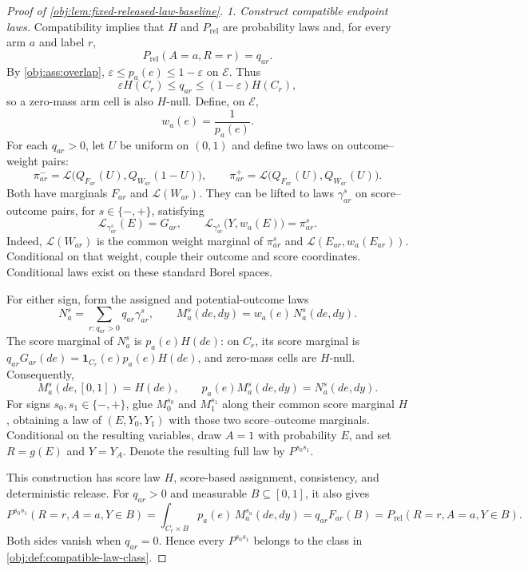 \begin{proof}[Proof of \cref{obj:lem:fixed-released-law-baseline}]
\noindent\emph{1. Construct compatible endpoint laws.}
Compatibility implies that \(H\) and \(P_{\mathrm{rel}}\) are probability laws and, for every arm \(a\) and label \(r\),
\[
P_{\mathrm{rel}}(A=a,R=r)=q_{ar}.
\]
By \cref{obj:ass:overlap}, \(\varepsilon\le p_a(e)\le 1-\varepsilon\) on \(\mathcal E\). Thus
\[
\varepsilon H(C_r)\le q_{ar}\le(1-\varepsilon)H(C_r),
\]
so a zero-mass arm cell is also \(H\)-null. Define, on \(\mathcal E\),
\[
w_a(e)=\frac{1}{p_a(e)}.
\]
For each \(q_{ar}>0\), let \(U\) be uniform on \((0,1)\) and define two laws on outcome–weight pairs:
\[
\pi_{ar}^{-}
=\mathcal L\bigl(Q_{F_{ar}}(U),Q_{W_{ar}}(1-U)\bigr),
\qquad
\pi_{ar}^{+}
=\mathcal L\bigl(Q_{F_{ar}}(U),Q_{W_{ar}}(U)\bigr).
\]
Both have marginals \(F_{ar}\) and \(\mathcal L(W_{ar})\). They can be lifted to laws \(\gamma_{ar}^{s}\) on score–outcome pairs, for \(s\in\{-,+\}\), satisfying
\[
\mathcal L_{\gamma_{ar}^{s}}(E)=G_{ar},
\qquad
\mathcal L_{\gamma_{ar}^{s}}\bigl(Y,w_a(E)\bigr)=\pi_{ar}^{s}.
\]
Indeed, \(\mathcal L(W_{ar})\) is the common weight marginal of \(\pi_{ar}^{s}\) and \(\mathcal L(E_{ar},w_a(E_{ar}))\). Conditional on that weight, couple their outcome and score coordinates. Conditional laws exist on these standard Borel spaces.

For either sign, form the assigned and potential-outcome laws
\[
N_a^{s}=\sum_{r:q_{ar}>0}q_{ar}\gamma_{ar}^{s},
\qquad
M_a^{s}(de,dy)=w_a(e)\,N_a^{s}(de,dy).
\]
The score marginal of \(N_a^{s}\) is \(p_a(e)H(de)\): on \(C_r\), its score marginal is \(q_{ar}G_{ar}(de)=\mathbf1_{C_r}(e)p_a(e)H(de)\), and zero-mass cells are \(H\)-null. Consequently,
\[
M_a^{s}(de,[0,1])=H(de),
\qquad
p_a(e)M_a^{s}(de,dy)=N_a^{s}(de,dy).
\]
For signs \(s_0,s_1\in\{-,+\}\), glue \(M_0^{s_0}\) and \(M_1^{s_1}\) along their common score marginal \(H\), obtaining a law of \((E,Y_0,Y_1)\) with those two score–outcome marginals. Conditional on the resulting variables, draw \(A=1\) with probability \(E\), and set \(R=g(E)\) and \(Y=Y_A\). Denote the resulting full law by \(P^{s_0s_1}\).

This construction has score law \(H\), score-based assignment, consistency, and deterministic release. For \(q_{ar}>0\) and measurable \(B\subseteq[0,1]\), it also gives
\[
P^{s_0s_1}(R=r,A=a,Y\in B)
=\int_{C_r\times B}p_a(e)\,M_a^{s_a}(de,dy)
=q_{ar}F_{ar}(B)
=P_{\mathrm{rel}}(R=r,A=a,Y\in B).
\]
Both sides vanish when \(q_{ar}=0\). Hence every \(P^{s_0s_1}\) belongs to the class in \cref{obj:def:compatible-law-class}. %


\end{proof}

